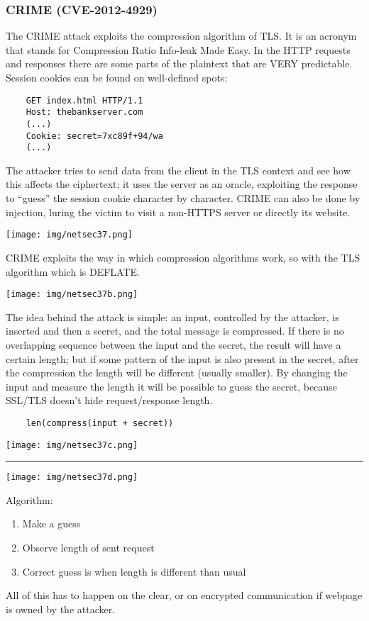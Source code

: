 \documentclass[a4paper, 10pt, titlepage]{article}
\begin{document}
\subsubsection{CRIME (CVE-2012-4929)}
The CRIME attack exploits the compression algorithm of TLS. It is an acronym that stands for Compression Ratio Info-leak Made Easy. In the HTTP requests and responses there are some parts of the plaintext that are VERY predictable. Session cookies can be found on well-defined spots:
\begin{lstlisting}
	GET index.html HTTP/1.1
	Host: thebankserver.com
	(...)
	Cookie: secret=7xc89f+94/wa
	(...)
\end{lstlisting}
The attacker tries to send data from the client in the TLS context and see how this affects the ciphertext; it uses the server as an oracle, exploiting the response to “guess” the session cookie character by character. CRIME can also be done by injection, luring the victim to visit a non-HTTPS server or directly its website.
\begin{center}
	\texttt{[image: img/netsec37.png]}
\end{center}
CRIME exploits the way in which compression algorithms work, so with the TLS algorithm which is DEFLATE.
\begin{center}
	\texttt{[image: img/netsec37b.png]}
\end{center}
The idea behind the attack is simple: an input, controlled by the attacker, is inserted and then a secret, and the total message is compressed. If there is no overlapping sequence between the input and the secret, the result will have a certain length; but if some pattern of the input is also present in the secret, after the compression the length will be different (usually smaller). By changing the input and measure the length it will be possible to guess the secret, because SSL/TLS doesn't hide request/response length.
\begin{lstlisting}
	len(compress(input + secret))
\end{lstlisting}
\begin{center}
	\texttt{[image: img/netsec37c.png]}
\end{center}

\begin{center}
	\noindent\rule{8cm}{0.4pt}
\end{center}

\begin{center}
	\texttt{[image: img/netsec37d.png]}
\end{center}
Algorithm:
\begin{enumerate}
	\item Make a guess
	\item Observe length of sent request
	\item Correct guess is when length is different than usual
\end{enumerate}
All of this has to happen on the clear, or on encrypted communication if webpage is owned by the attacker.
\end{document}
